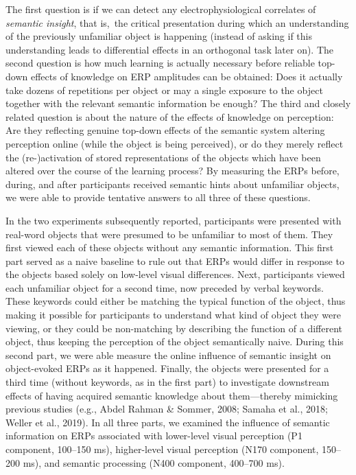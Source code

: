 \documentclass[
  english,
  man,floatsintext]{apa7}
\begin{document}
The first question is if we can detect any electrophysiological correlates of \emph{semantic insight}, that is,~the critical presentation during which an understanding of the previously unfamiliar object is happening (instead of asking if this understanding leads to differential effects in an orthogonal task later on). The second question is how much learning is actually necessary before reliable top-down effects of knowledge on ERP amplitudes can be obtained: Does it actually take dozens of repetitions per object or may a single exposure to the object together with the relevant semantic information be enough? The third and closely related question is about the nature of the effects of knowledge on perception: Are they reflecting genuine top-down effects of the semantic system altering perception online (while the object is being perceived), or do they merely reflect the (re-)activation of stored representations of the objects which have been altered over the course of the learning process? By measuring the ERPs before, during, and after participants received semantic hints about unfamiliar objects, we were able to provide tentative answers to all three of these questions.

In the two experiments subsequently reported, participants were presented with real-word objects that were presumed to be unfamiliar to most of them. They first viewed each of these objects without any semantic information. This first part served as a naive baseline to rule out that ERPs would differ in response to the objects based solely on low-level visual differences. Next, participants viewed each unfamiliar object for a second time, now preceded by verbal keywords. These keywords could either be matching the typical function of the object, thus making it possible for participants to understand what kind of object they were viewing, or they could be non-matching by describing the function of a different object, thus keeping the perception of the object semantically naive. During this second part, we were able measure the online influence of semantic insight on object-evoked ERPs as it happened. Finally, the objects were presented for a third time (without keywords, as in the first part) to investigate downstream effects of having acquired semantic knowledge about them---thereby mimicking previous studies (e.g., Abdel Rahman \& Sommer, 2008; Samaha et al., 2018; Weller et al., 2019). In all three parts, we examined the influence of semantic information on ERPs associated with lower-level visual perception (P1 component, 100--150 ms), higher-level visual perception (N170 component, 150--200 ms), and semantic processing (N400 component, 400--700 ms).
\end{document}
